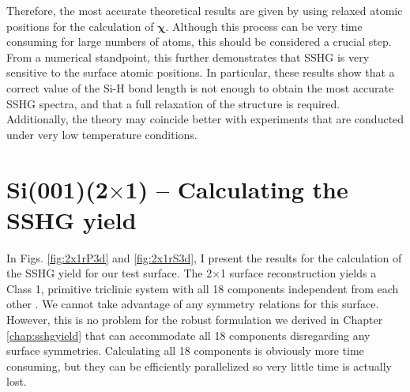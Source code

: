Therefore, the most accurate theoretical results are given by using relaxed
atomic positions for the calculation of $\boldsymbol{\chi}$. Although this
process can be very time consuming for large numbers of atoms, this should be
considered a crucial step. From a numerical standpoint, this further
demonstrates that SSHG is very sensitive to the surface atomic positions. In
particular, these results show that a correct value of the Si-H bond length is
not enough to obtain the most accurate SSHG spectra, and that a full relaxation
of the structure is required. Additionally, the theory may coincide better with
experiments that are conducted under very low temperature conditions.



\section{\texorpdfstring{Si(001)(2$\times$1)}{Si(001)(2x1)} -- Calculating the 
SSHG yield}\label{sec:2x1R3D}

In Figs. \ref{fig:2x1rP3d} and \ref{fig:2x1rS3d}, I present the results for the
calculation of the SSHG yield for our test surface. The 2$\times$1 surface
reconstruction yields a Class 1, primitive triclinic system with all 18
components independent from each other \cite{popovbook}. We cannot take
advantage of any symmetry relations for this surface. However, this is no
problem for the robust formulation we derived in Chapter \ref{chap:sshgyield}
that can accommodate all 18 components disregarding any surface symmetries.
Calculating all 18 components is obviously more time consuming, but they can be
efficiently parallelized so very little time is actually lost.

